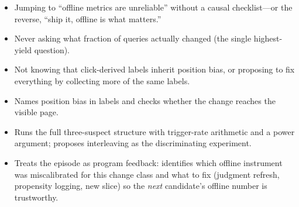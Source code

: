 \begin{interviewq}
\redflags
\begin{itemize}
    \item Jumping to ``offline metrics are unreliable'' without a causal checklist---or the reverse, ``ship it, offline is what matters.''
    \item Never asking what fraction of queries actually changed (the single highest-yield question).
    \item Not knowing that click-derived labels inherit position bias, or proposing to fix everything by collecting more of the same labels.
\end{itemize}


\goodgreat
\begin{itemize}
    \item {} Names position bias in labels and checks whether the change reaches the visible page.
    \item {} Runs the full three-suspect structure with trigger-rate arithmetic and a power argument; proposes interleaving as the discriminating experiment.
    \item {} Treats the episode as program feedback: identifies which offline instrument was miscalibrated for this change class and what to fix (judgment refresh, propensity logging, new slice) so the \textit{next} candidate's offline number is trustworthy.
\end{itemize}

\end{interviewq}

